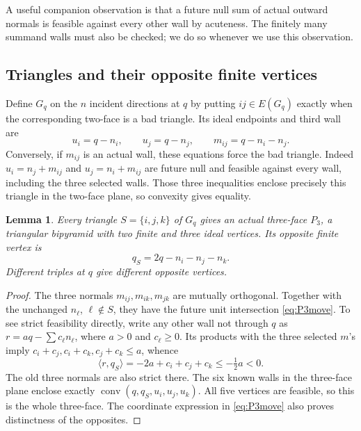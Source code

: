 \documentclass[11pt]{article}
\newtheorem{lemma}[theorem]{Lemma}
\theoremstyle{definition}\newtheorem{definition}[theorem]{Definition}
\theoremstyle{remark}\newtheorem{remark}[theorem]{Remark}
\newcommand{\ip}[2]{\langle #1,#2\rangle}
\newcommand{\Pthree}{P_3}
\begin{document}
A useful companion observation is that a future null sum of actual
outward normals is feasible against every other wall by acuteness.
The finitely many summand walls must also be checked; we do so whenever
we use this observation.

\subsection{Triangles and their opposite finite vertices}
Define \(G_q\) on the \(n\) incident directions at \(q\) by putting
\(ij\in E(G_q)\) exactly when the corresponding two-face is a bad
triangle. Its ideal endpoints and third wall are
\begin{equation}\label{eq:badwall}
 u_i=q-n_i,\qquad u_j=q-n_j,\qquad m_{ij}=q-n_i-n_j.
\end{equation}
Conversely, if \(m_{ij}\) is an actual wall, these equations force the
bad triangle. Indeed \(u_i=n_j+m_{ij}\) and \(u_j=n_i+m_{ij}\)
are future null and feasible against every wall, including the three
selected walls. Those three inequalities enclose precisely this triangle
in the two-face plane, so convexity gives equality.

\begin{lemma}\label{lem:P3}
Every triangle \(S=\{i,j,k\}\) of \(G_q\) gives an actual three-face
\(\Pthree\), a triangular bipyramid with two finite and three ideal
vertices. Its opposite finite vertex is
\begin{equation}\label{eq:P3move}
 q_S=2q-n_i-n_j-n_k.
\end{equation}
Different triples at \(q\) give different opposite vertices.
\end{lemma}
\begin{proof}
The three normals \(m_{ij},m_{ik},m_{jk}\) are mutually orthogonal.
Together with the unchanged \(n_\ell\), \(\ell\notin S\), they
have the future unit intersection \eqref{eq:P3move}. To see strict
feasibility directly, write any other wall not through \(q\) as
\(r=a q-\sum c_\ell n_\ell\), where \(a>0\) and \(c_\ell\ge0\).
Its products with the three selected \(m\)'s imply
\(c_i+c_j,c_i+c_k,c_j+c_k\le a\), whence
\[
 \ip{r}{q_S}=-2a+c_i+c_j+c_k\le-\tfrac12a<0.
\]
The old three normals are also strict there. The six known walls in
the three-face plane enclose exactly
\(\operatorname{conv}(q,q_S,u_i,u_j,u_k)\). All five vertices are
feasible, so this is the whole three-face. The coordinate expression
in \eqref{eq:P3move} also proves distinctness of the opposites.
\end{proof}
\end{document}
